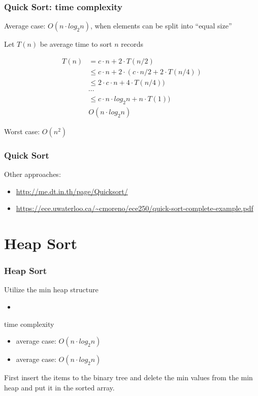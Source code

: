 \documentclass[newPxFont,sthlmFooter,nooffset]{beamer}
\begin{document}
\begin{frame}[t]
  \frametitle{Quick Sort: time complexity}
Average case: $O(n \cdot log_2n)$, when elements can be split into ``equal size''

Let $T(n)$ be average time to sort $n$ records

\begin{align*}
T(n) & =  c \cdot n + 2 \cdot T(n/2) \\
     &\leq c \cdot n + 2 \cdot (c \cdot n/2 + 2 \cdot T(n/4)) \\
     &\leq 2 \cdot c \cdot n + 4 \cdot T(n/4)) \\
     & \cdots \\
     &\leq c \cdot n \cdot log_2n + n \cdot T(1)) \\
     & O(n\cdot log_2n)
\end{align*}

Worst case: $O(n^2)$
\end{frame}


\begin{frame}[t]
  \frametitle{Quick Sort}
  Other approaches: 
  \begin{itemize}
  \item     \url{http://me.dt.in.th/page/Quicksort/}
  \item     \url{https://ece.uwaterloo.ca/~cmoreno/ece250/quick-sort-complete-example.pdf}
  \end{itemize}
\end{frame}


\section{Heap Sort}
\begin{frame}[t]
  \frametitle{Heap Sort}
Utilize the min heap structure
\begin{itemize}
\item<implement min heap with array> 
\end{itemize}

time complexity
\begin{itemize}
\item average case: $O(n \cdot log_2n)$
\item average case: $O(n \cdot log_2n)$
\end{itemize}

First insert the items to the binary tree and delete the min values from the min heap and put it in the sorted array.
\end{frame}
\end{document}
